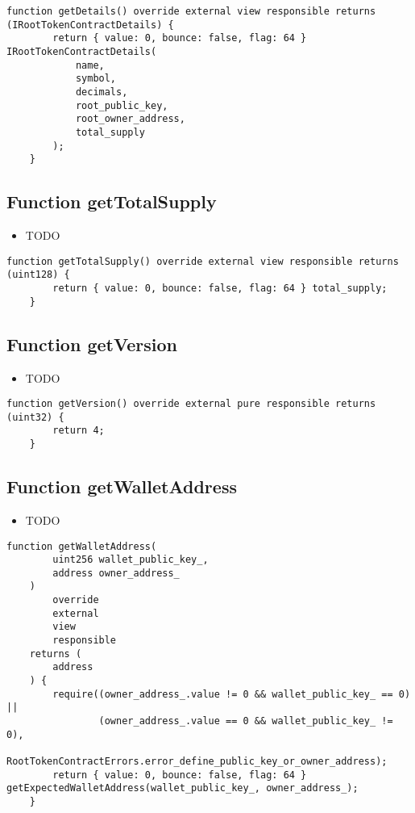 \begin{lstlisting}[firstnumber=78]
    function getDetails() override external view responsible returns (IRootTokenContractDetails) {
        return { value: 0, bounce: false, flag: 64 } IRootTokenContractDetails(
            name,
            symbol,
            decimals,
            root_public_key,
            root_owner_address,
            total_supply
        );
    }
\end{lstlisting}

\subsection{Function getTotalSupply}

\noindent\begin{itemize}
\item TODO
\end{itemize}

\begin{lstlisting}[firstnumber=93]
    function getTotalSupply() override external view responsible returns (uint128) {
        return { value: 0, bounce: false, flag: 64 } total_supply;
    }
\end{lstlisting}

\subsection{Function getVersion}

\noindent\begin{itemize}
\item TODO
\end{itemize}

\begin{lstlisting}[firstnumber=64]
    function getVersion() override external pure responsible returns (uint32) {
        return 4;
    }
\end{lstlisting}

\subsection{Function getWalletAddress}

\noindent\begin{itemize}
\item TODO
\end{itemize}

\begin{lstlisting}[firstnumber=112]
    function getWalletAddress(
        uint256 wallet_public_key_,
        address owner_address_
    )
        override
        external
        view
        responsible
    returns (
        address
    ) {
        require((owner_address_.value != 0 && wallet_public_key_ == 0) ||
                (owner_address_.value == 0 && wallet_public_key_ != 0),
                RootTokenContractErrors.error_define_public_key_or_owner_address);
        return { value: 0, bounce: false, flag: 64 } getExpectedWalletAddress(wallet_public_key_, owner_address_);
    }
\end{lstlisting}

